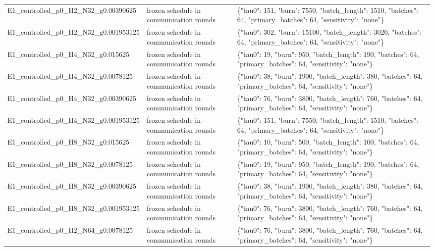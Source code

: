 \begin{tabular}{lll}
E1\_controlled\_p0\_H2\_N32\_g0.00390625 & frozen schedule in communication rounds & \{"tau0": 151, "burn": 7550, "batch\_length": 1510, "batches": 64, "primary\_batches": 64, "sensitivity": "none"\} \\
E1\_controlled\_p0\_H2\_N32\_g0.001953125 & frozen schedule in communication rounds & \{"tau0": 302, "burn": 15100, "batch\_length": 3020, "batches": 64, "primary\_batches": 64, "sensitivity": "none"\} \\
E1\_controlled\_p0\_H4\_N32\_g0.015625 & frozen schedule in communication rounds & \{"tau0": 19, "burn": 950, "batch\_length": 190, "batches": 64, "primary\_batches": 64, "sensitivity": "none"\} \\
E1\_controlled\_p0\_H4\_N32\_g0.0078125 & frozen schedule in communication rounds & \{"tau0": 38, "burn": 1900, "batch\_length": 380, "batches": 64, "primary\_batches": 64, "sensitivity": "none"\} \\
E1\_controlled\_p0\_H4\_N32\_g0.00390625 & frozen schedule in communication rounds & \{"tau0": 76, "burn": 3800, "batch\_length": 760, "batches": 64, "primary\_batches": 64, "sensitivity": "none"\} \\
E1\_controlled\_p0\_H4\_N32\_g0.001953125 & frozen schedule in communication rounds & \{"tau0": 151, "burn": 7550, "batch\_length": 1510, "batches": 64, "primary\_batches": 64, "sensitivity": "none"\} \\
E1\_controlled\_p0\_H8\_N32\_g0.015625 & frozen schedule in communication rounds & \{"tau0": 10, "burn": 500, "batch\_length": 100, "batches": 64, "primary\_batches": 64, "sensitivity": "none"\} \\
E1\_controlled\_p0\_H8\_N32\_g0.0078125 & frozen schedule in communication rounds & \{"tau0": 19, "burn": 950, "batch\_length": 190, "batches": 64, "primary\_batches": 64, "sensitivity": "none"\} \\
E1\_controlled\_p0\_H8\_N32\_g0.00390625 & frozen schedule in communication rounds & \{"tau0": 38, "burn": 1900, "batch\_length": 380, "batches": 64, "primary\_batches": 64, "sensitivity": "none"\} \\
E1\_controlled\_p0\_H8\_N32\_g0.001953125 & frozen schedule in communication rounds & \{"tau0": 76, "burn": 3800, "batch\_length": 760, "batches": 64, "primary\_batches": 64, "sensitivity": "none"\} \\
E1\_controlled\_p0\_H2\_N64\_g0.0078125 & frozen schedule in communication rounds & \{"tau0": 76, "burn": 3800, "batch\_length": 760, "batches": 64, "primary\_batches": 64, "sensitivity": "none"\} \\

\end{tabular}
